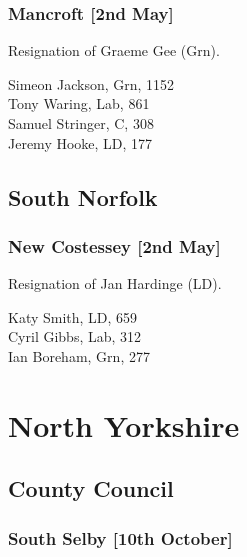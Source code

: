 \documentclass[a4paper,openany,10pt]{book}
\begin{document}
\subsubsection*{Mancroft \hspace*{\fill}\nolinebreak[1]%
\enspace\hspace*{\fill}
[2nd May]}


Resignation of Graeme Gee (Grn).



Simeon Jackson, Grn, 1152\\
Tony Waring, Lab, 861\\
Samuel Stringer, C, 308\\
Jeremy Hooke, LD, 177\\


\subsection*{South Norfolk}

\subsubsection*{New Costessey \hspace*{\fill}\nolinebreak[1]%
\enspace\hspace*{\fill}
[2nd May]}


Resignation of Jan Hardinge (LD).



Katy Smith, LD, 659\\
Cyril Gibbs, Lab, 312\\
Ian Boreham, Grn, 277\\




\section[North Yorkshire]{{North Yorkshire}}

\subsection*{County Council}

\subsubsection*{South Selby \hspace*{\fill}\nolinebreak[1]%
\enspace\hspace*{\fill}
[10th October]}
\end{document}
